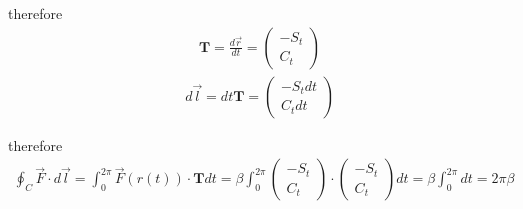 \documentclass[11pt,a4paper]{article}
\begin{document}
\begin{enumerate}
therefore
\begin{align}
\mathbf{T}=\frac{d\vec{r}}{dt}=
\begin{pmatrix}
-S_t \\
C_t
\end{pmatrix}
\end{align}
\begin{align}
d\vec{l}=dt\mathbf{T}=
\begin{pmatrix}
-S_tdt \\
C_tdt
\end{pmatrix}
\end{align}

therefore
\begin{align}
\oint_C \vec{F}\cdot d\vec{l}=\int_0^{2\pi}\vec{F}(r(t))\cdot\mathbf{T}dt=
\beta\int_0^{2\pi}
\begin{pmatrix}
-S_t \\
C_t
\end{pmatrix}\cdot
\begin{pmatrix}
-S_t \\
C_t
\end{pmatrix}dt
=
\beta\int_0^{2\pi}dt=2\pi\beta
\end{align}

\end{enumerate}
\end{document}

